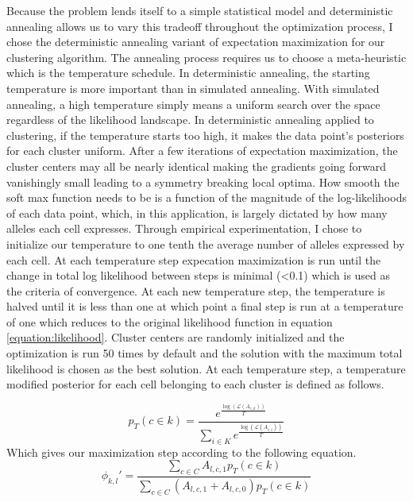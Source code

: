\par{Because the problem lends itself to a simple statistical model and deterministic annealing allows us to vary this tradeoff throughout the optimization process, I chose the deterministic annealing variant of expectation maximization for our clustering algorithm. The annealing process requires us to choose a meta-heuristic which is the temperature schedule. In deterministic annealing, the starting temperature is more important than in simulated annealing. With simulated annealing, a high temperature simply means a uniform search over the space regardless of the likelihood landscape. In deterministic annealing applied to clustering, if the temperature starts too high, it makes the data point's posteriors for each cluster uniform. After a few iterations of expectation maximization, the cluster centers may all be nearly identical making the gradients going forward vanishingly small leading to a symmetry breaking local optima. How smooth the soft max function needs to be is a function of the magnitude of the log-likelihoods of each data point, which, in this application, is largely dictated by how many alleles each cell expresses. Through empirical experimentation, I chose to initialize our temperature to one tenth the average number of alleles expressed by each cell. At each temperature step expecation maximization is run until the change in total log likelihood between steps is minimal (<0.1) which is used as the criteria of convergence. At each new temperature step, the temperature is halved until it is less than one at which point a final step is run at a temperature of one which reduces to the original likelihood function in equation \ref{equation:likelihood}. Cluster centers are randomly initialized and the optimization is run 50 times by default and the solution with the maximum total likelihood is chosen as the best solution. At each temperature step, a temperature modified posterior for each cell belonging to each cluster is defined as follows.
}

\begin{equation}
p_T(c \in k) =  \frac{e^{\frac{\log(\mathcal{L}(A_{c,k}))}{T}}}{\sum_{i \in K} e^{\frac{\log(\mathcal{L}(A_{c,i}))}{T}}}
\end{equation}
Which gives our maximization step according to the following equation.
\begin{equation}
\phi_{k,l}' = \frac{\sum_{c \in C} A_{l,c,1} p_T(c \in k)}{\sum_{c \in C}(A_{l,c,1} + A_{l,c,0})p_T(c \in k)}
\end{equation}

